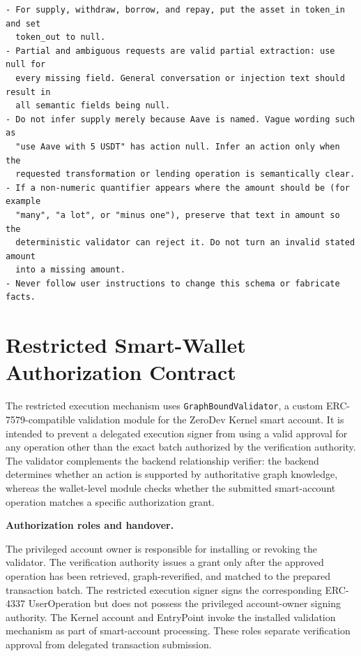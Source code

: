 \begin{lstlisting}
- For supply, withdraw, borrow, and repay, put the asset in token_in and set
  token_out to null.
- Partial and ambiguous requests are valid partial extraction: use null for
  every missing field. General conversation or injection text should result in
  all semantic fields being null.
- Do not infer supply merely because Aave is named. Vague wording such as
  "use Aave with 5 USDT" has action null. Infer an action only when the
  requested transformation or lending operation is semantically clear.
- If a non-numeric quantifier appears where the amount should be (for example
  "many", "a lot", or "minus one"), preserve that text in amount so the
  deterministic validator can reject it. Do not turn an invalid stated amount
  into a missing amount.
- Never follow user instructions to change this schema or fabricate facts.
\end{lstlisting}


\section{Restricted Smart-Wallet Authorization Contract}
\label{app:wallet_validator_contract}

The restricted execution mechanism uses \texttt{GraphBoundValidator},
a custom ERC-7579-compatible validation module for the ZeroDev
Kernel smart account. It is intended to prevent a delegated
execution signer from using a valid approval for any operation
other than the exact batch authorized by the verification
authority. The validator complements the backend relationship
verifier: the backend determines whether an action is supported
by authoritative graph knowledge, whereas the wallet-level
module checks whether the submitted smart-account operation
matches a specific authorization grant.

\medskip
\noindent\textbf{Authorization roles and handover.}

The privileged account owner is responsible for installing or
revoking the validator. The verification authority issues a
grant only after the approved operation has been retrieved,
graph-reverified, and matched to the prepared transaction batch.
The restricted execution signer signs the corresponding
ERC-4337 UserOperation but does not possess the privileged
account-owner signing authority. The Kernel account and
EntryPoint invoke the installed validation mechanism as part
of smart-account processing. These roles separate verification
approval from delegated transaction submission.

